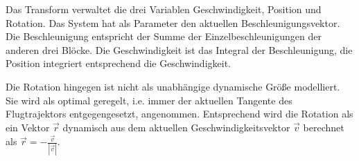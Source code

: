 \label{transform}
Das Transform verwaltet die drei Variablen Ge\-schwin\-dig\-keit, Position und Rotation. Das System hat als Parameter den aktuellen Beschleunigungsvektor. Die Beschleunigung entspricht der Summe der Einzelbeschleunigungen der anderen drei Blöcke. Die Geschwindigkeit ist das Integral der Beschleunigung, die Position integriert entsprechend die Geschwindigkeit.

Die Rotation hingegen ist nicht als unabhängige dynamische Größe modelliert. Sie wird als optimal geregelt, i.e. immer der aktuellen Tangente des Flugtrajektors entgegengesetzt, angenommen. Entsprechend wird die Rotation als ein Vektor $\vec r$ dynamisch aus dem aktuellen Geschwindigkeitsvektor $\vec v$ berechnet als $\vec r = -\frac{\vec v}{|\vec v|}$.\\ \\